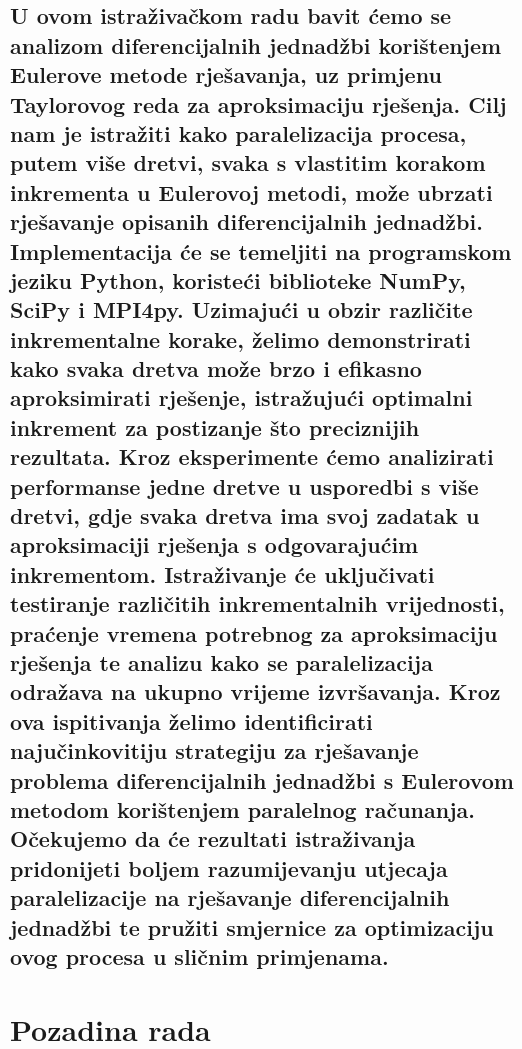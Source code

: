 \documentclass[conference]{IEEEtran}
\begin{document}
\subsection{U ovom istraživačkom radu bavit ćemo se analizom diferencijalnih jednadžbi korištenjem Eulerove metode rješavanja, uz primjenu Taylorovog reda za aproksimaciju rješenja. Cilj nam je istražiti kako paralelizacija procesa, putem više dretvi, svaka s vlastitim korakom inkrementa u Eulerovoj metodi, može ubrzati rješavanje opisanih diferencijalnih jednadžbi. Implementacija će se temeljiti na programskom jeziku Python, koristeći biblioteke NumPy, SciPy i MPI4py. Uzimajući u obzir različite inkrementalne korake, želimo demonstrirati kako svaka dretva može brzo i efikasno aproksimirati rješenje, istražujući optimalni inkrement za postizanje što preciznijih rezultata. Kroz eksperimente ćemo analizirati performanse jedne dretve u usporedbi s više dretvi, gdje svaka dretva ima svoj zadatak u aproksimaciji rješenja s odgovarajućim inkrementom. Istraživanje će uključivati testiranje različitih inkrementalnih vrijednosti, praćenje vremena potrebnog za aproksimaciju rješenja te analizu kako se paralelizacija odražava na ukupno vrijeme izvršavanja. Kroz ova ispitivanja želimo identificirati najučinkovitiju strategiju za rješavanje problema diferencijalnih jednadžbi s Eulerovom metodom korištenjem paralelnog računanja. Očekujemo da će rezultati istraživanja pridonijeti boljem razumijevanju utjecaja paralelizacije na rješavanje diferencijalnih jednadžbi te pružiti smjernice za optimizaciju ovog procesa u sličnim primjenama.}

\pagebreak

\section{Pozadina rada \newline}
\end{document}
